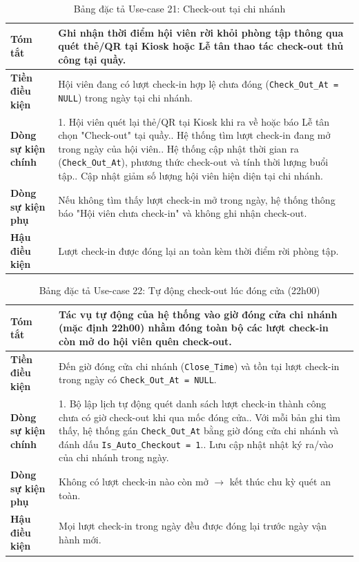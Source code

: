 \documentclass[a4paper,12pt]{article}
\begin{document}
\begin{table}[H]\centering\footnotesize
\begin{tabularx}{\textwidth}{|L{3.2cm}|Y|}
\hline \textbf{Tóm tắt} & Ghi nhận thời điểm hội viên rời khỏi phòng tập thông qua quét thẻ/QR tại Kiosk hoặc Lễ tân thao tác check-out thủ công tại quầy. \\ \hline
\textbf{Tiền điều kiện} & Hội viên đang có lượt check-in hợp lệ chưa đóng (\texttt{Check\_Out\_At = NULL}) trong ngày tại chi nhánh. \\ \hline
\textbf{Dòng sự kiện chính} & 1. Hội viên quét lại thẻ/QR tại Kiosk khi ra về hoặc báo Lễ tân chọn "Check-out" tại quầy.. Hệ thống tìm lượt check-in đang mở trong ngày của hội viên.. Hệ thống cập nhật thời gian ra (\texttt{Check\_Out\_At}), phương thức check-out và tính thời lượng buổi tập.. Cập nhật giảm số lượng hội viên hiện diện tại chi nhánh. \\ \hline
\textbf{Dòng sự kiện phụ} & Nếu không tìm thấy lượt check-in mở trong ngày, hệ thống thông báo "Hội viên chưa check-in" và không ghi nhận check-out. \\ \hline
\textbf{Hậu điều kiện} & Lượt check-in được đóng lại an toàn kèm thời điểm rời phòng tập. \\ \hline
\end{tabularx}
\caption{Bảng đặc tả Use-case 21: Check-out tại chi nhánh}
\end{table}

\begin{table}[H]\centering\footnotesize
\begin{tabularx}{\textwidth}{|L{3.2cm}|Y|}
\hline \textbf{Tóm tắt} & Tác vụ tự động của hệ thống vào giờ đóng cửa chi nhánh (mặc định 22h00) nhằm đóng toàn bộ các lượt check-in còn mở do hội viên quên check-out. \\ \hline
\textbf{Tiền điều kiện} & Đến giờ đóng cửa chi nhánh (\texttt{Close\_Time}) và tồn tại lượt check-in trong ngày có \texttt{Check\_Out\_At = NULL}. \\ \hline
\textbf{Dòng sự kiện chính} & 1. Bộ lập lịch tự động quét danh sách lượt check-in thành công chưa có giờ check-out khi qua mốc đóng cửa.. Với mỗi bản ghi tìm thấy, hệ thống gán \texttt{Check\_Out\_At} bằng giờ đóng cửa chi nhánh và đánh dấu \texttt{Is\_Auto\_Checkout = 1}.. Lưu cập nhật nhật ký ra/vào của chi nhánh trong ngày. \\ \hline
\textbf{Dòng sự kiện phụ} & Không có lượt check-in nào còn mở $\rightarrow$ kết thúc chu kỳ quét an toàn. \\ \hline
\textbf{Hậu điều kiện} & Mọi lượt check-in trong ngày đều được đóng lại trước ngày vận hành mới. \\ \hline
\end{tabularx}
\caption{Bảng đặc tả Use-case 22: Tự động check-out lúc đóng cửa (22h00)}
\end{table}
\end{document}
